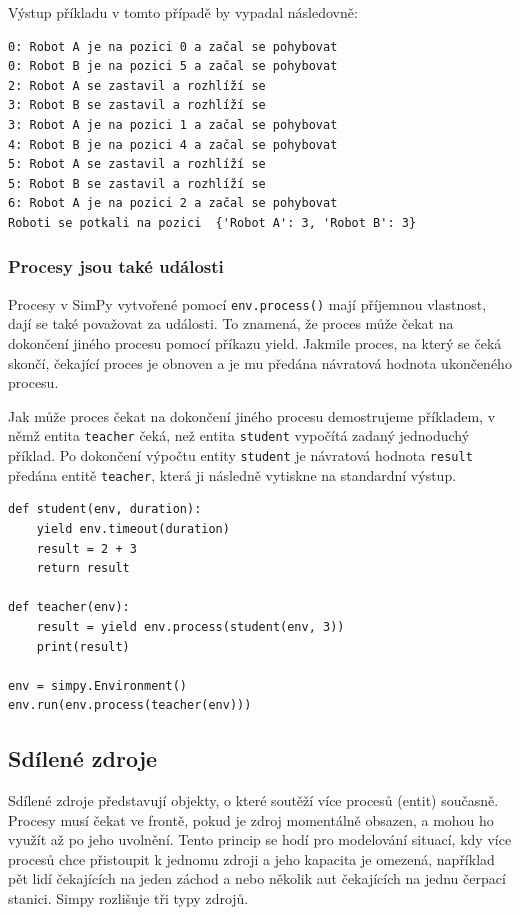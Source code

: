 \documentclass[12pt,a4paper]{article}
\begin{document}
\noindent Výstup příkladu v tomto případě by vypadal následovně:

\begin{verbatim}
0: Robot A je na pozici 0 a začal se pohybovat
0: Robot B je na pozici 5 a začal se pohybovat
2: Robot A se zastavil a rozhlíží se
3: Robot B se zastavil a rozhlíží se
3: Robot A je na pozici 1 a začal se pohybovat
4: Robot B je na pozici 4 a začal se pohybovat
5: Robot A se zastavil a rozhlíží se
5: Robot B se zastavil a rozhlíží se
6: Robot A je na pozici 2 a začal se pohybovat
Roboti se potkali na pozici  {'Robot A': 3, 'Robot B': 3}
\end{verbatim}

\subsubsection{Procesy jsou také události}
Procesy v SimPy vytvořené pomocí \texttt{env.process()} mají příjemnou vlastnost, dají se také považovat za události. To znamená, že proces může čekat na dokončení jiného procesu pomocí příkazu yield. Jakmile proces, na který se čeká skončí, čekající proces je obnoven a je mu předána návratová hodnota ukončeného procesu.

Jak může proces čekat na dokončení jiného procesu demostrujeme příkladem, v němž entita \texttt{teacher} čeká, než entita \texttt{student} vypočítá zadaný jednoduchý příklad. Po dokončení výpočtu entity \texttt{student} je návratová hodnota \texttt{result} předána entitě \texttt{teacher}, která ji následně vytiskne na standardní výstup. 

\begin{verbatim}
def student(env, duration):
    yield env.timeout(duration)
    result = 2 + 3
    return result

def teacher(env):
    result = yield env.process(student(env, 3))
    print(result)

env = simpy.Environment()
env.run(env.process(teacher(env)))
\end{verbatim}

\subsection{Sdílené zdroje}

Sdílené zdroje představují objekty, o které soutěží více procesů (entit) současně. Procesy musí čekat ve frontě, pokud je zdroj momentálně obsazen, a mohou ho využít až po jeho uvolnění. Tento princip se hodí pro modelování situací, kdy více procesů chce přistoupit k jednomu zdroji a jeho kapacita je omezená, například pět lidí čekajících na jeden záchod a nebo několik aut čekajících na jednu čerpací stanici. Simpy rozlišuje tři typy zdrojů.
\end{document}
